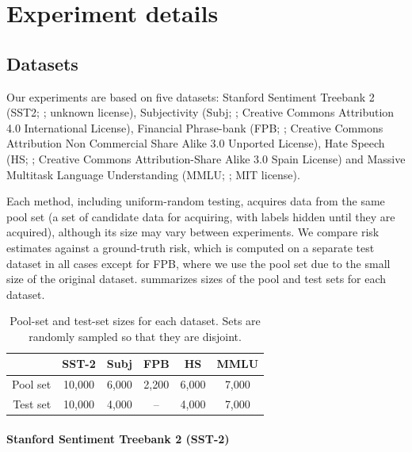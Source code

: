 \section{Experiment details}\label{sec:experiment_details}


\subsection{Datasets}\label{datasets}

Our experiments are based on five datasets: Stanford Sentiment Treebank 2 (SST2; \citealp{socher2013recursive}; unknown license), Subjectivity (Subj; \citealp{pang2004sentimental}; Creative Commons Attribution 4.0 International License), Financial Phrase-bank (FPB; \citealp{malo2013good}; Creative Commons Attribution Non Commercial Share Alike 3.0 Unported License), Hate Speech (HS; \citealp{degibert2018hate}; Creative Commons Attribution-Share Alike 3.0 Spain License) and Massive Multitask Language Understanding (MMLU; \citealp{hendrycks2021measuring}; MIT license).

Each method, including uniform-random testing, acquires data from the same pool set (a set of candidate data for acquiring, with labels hidden until they are acquired), although its size may vary between experiments.
We compare risk estimates against a ground-truth risk, which is computed on a separate test dataset in all cases except for FPB, where we use the pool set due to the small size of the original dataset.
 summarizes sizes of the pool and test sets for each dataset.

\begin{table}[h]
    \centering
    \small
    \begin{tabular}{r c c c c c}
        \toprule
        & SST-2 & Subj & FPB & HS & MMLU \\
        \midrule
        Pool set & 10,000 & 6,000 & 2,200 & 6,000 & 7,000\\
        Test set & 10,000 & 4,000 & -- & 4,000 & 7,000 \\
        \bottomrule
    \end{tabular}
    \vspace{1em}
    \caption{Pool-set and test-set sizes for each dataset. Sets are randomly sampled so that they are disjoint.}
    \label{tab:set_sizes}
\end{table}


\paragraph{Stanford Sentiment Treebank 2 (SST-2)}

